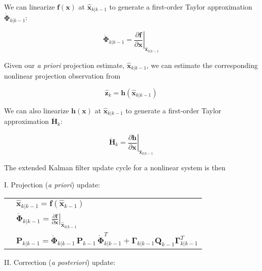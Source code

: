 We can linearize $\mathbf{f} \left( \mathbf{x} \right)$ at $\hat{\mathbf{x}}_{k|k-1}$ to
generate a first-order Taylor approximation $\mathbf{\acute{\Phi}}_{k|k-1}$:

\begin{equation*}
    \mathbf{\acute{\Phi}}_{k|k-1} = \left. \frac{\partial \mathbf{f}}{\partial \mathbf{x}} \right|_{\hat{\mathbf{x}}_{k|k-1}}
\end{equation*}

Given our \textit{a priori} projection estimate, $\hat{\mathbf{x}}_{k|k-1}$, we can
estimate the corresponding nonlinear projection observation from

\begin{equation*}
    \hat{\mathbf{z}}_{k} = \mathbf{h} \left( \hat{\mathbf{x}}_{k|k-1} \right)
\end{equation*}

We can also linearize $\mathbf{h} \left( \mathbf{x} \right)$ at $\hat{\mathbf{x}}_{k|k-1}$
to generate a first-order Taylor approximation $\mathbf{\acute{H}}_k$:

\begin{equation*}
    \mathbf{\acute{H}}_{k} = \left. \frac{\partial \mathbf{h}}{\partial \mathbf{x}} \right|_{\hat{\mathbf{x}}_{k|k-1}}
\end{equation*}

The extended Kalman filter update cycle for a nonlinear system is then

I. Projection (\textit{a priori}) update:

\begingroup
\renewcommand{\arraystretch}{1.25}
\begin{tabular}{l l}
\phantom{.} & $\hat{\mathbf{x}}_{k|k-1} = \mathbf{f} \left( \hat{\mathbf{x}}_{k-1} \right)$ \\
\phantom{.} & $\mathbf{\acute{\Phi}}_{k|k-1} = \left. \displaystyle{\frac{\partial \mathbf{f}}{\partial \mathbf{x}}} \right|_{\hat{\mathbf{x}}_{k|k-1}}$ \\
\phantom{.} & $\mathbf{P}_{k|k-1} = \mathbf{\acute{\Phi}}_{k|k-1} \, \mathbf{P}_{k-1} \, \mathbf{\acute{\Phi}}_{k|k-1}^T + \mathbf{\Gamma}_{k|k-1} \mathbf{Q}_{k-1} \mathbf{\Gamma}_{k|k-1}^T$
\end{tabular}
\endgroup

II. Correction (\textit{a posteriori}) update:

